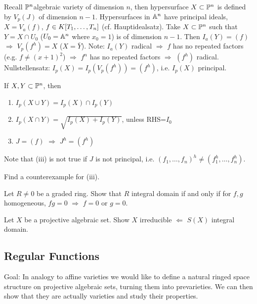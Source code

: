 \documentclass[a4paper,11pt]{article}
\begin{document}
{				\begin{remark}
					Recall $\P^n$algebraic variety of dimension $n$, then hypersurface $X\subset\P^n$ is defined by $V_p(J)$ of dimension $n-1$. Hypersurfaces in $\AA^n$ have principal ideals, $X=V_a(f)$, $f\in\K$ (cf. Hauptidealsatz). Take $X\subset\P^n$ such that $Y=X\cap U_0$ ($U_0=\AA^n$ where $x_0=1$) is of dimension $n-1$. Then $I_a(Y)=(f)$ $\Longrightarrow$ $V_p(f^h)=X$ ($X=\bar{Y}$). Note: $I_a(Y)$ radical $\Longrightarrow$ $f$ has no repeated factors (e.g. $f\neq(x+1)^2$) $\Longrightarrow$ $f^n$ has no repeated factors $\Longrightarrow$ $(f^h)$ radical. Nullstellensatz: $I_p(X)=I_p(V_p(f^h))=(f^h)$, i.e. $I_p(X)$ principal. 
				\end{remark}

				\begin{remark}
					If $X,Y\subset\P^n$, then 
					\begin{enumerate}
						\item $I_p(X\cup Y)=I_p(X)\cap I_p(Y)$
						\item $I_p(X\cap Y)=\sqrt{I_p(X)+I_p(Y)}$, unless RHS=$I_0$
						\item $J=(f)$ $\Longrightarrow$ $J^h=(f^h)$
					\end{enumerate}
					Note that (iii) is not true if $J$ is not principal, i.e. $(f_1,\dots,f_n)^h\neq(f_1^h,\dots,f_n^h)$.
				\end{remark}

				\begin{exc}
					Find a counterexample for (iii).
				\end{exc}

				\begin{exc}
					Let $R\neq0$ be a graded ring. Show that $R$ integral domain if and only if for $f,g$ homogeneous, $fg=0$ $\Longrightarrow$ $f=0$ or $g=0$. 
				\end{exc}

				\begin{exc}
					Let $X$ be a projective algebraic set. Show $X$ irreducible $\Longleftarrow$ $S(X)$ integral domain.
				\end{exc}
			
			}			
		

		\subsection{Regular Functions}

			\noindent Goal: In analogy to affine varieties we would like to define a natural ringed space structure on projective algebraic sets, turning them into prevarieties. We can then show that they are actually varieties and study their properties.
			\\
\end{document}
